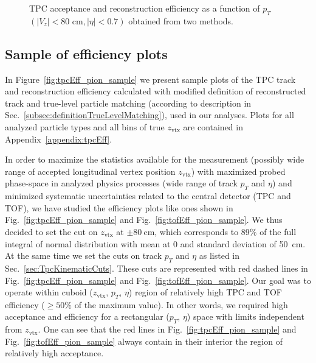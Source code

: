 \begin{figure}[ht]
{	}%
	\caption[TPC acceptance and reconstruction efficiency as a function of $p_T$ $\left(|V_z|<80\textrm{ cm}, |\eta|<0.7\right)$ obtained from two methods.]{TPC acceptance and reconstruction efficiency as a function of $p_T$ $\left(|V_z|<80\textrm{ cm}, |\eta|<0.7\right)$ obtained from two methods.}\label{fig:trackTPCefficiencyComparisonEtaPhi}
\end{figure}


\subsection{Sample of  efficiency plots}\label{subsec:sampleTpcEffPlots}

In Figure~\ref{fig:tpcEff_pion_sample} we present sample plots of the TPC track and reconstruction efficiency calculated with modified definition of reconstructed track and true-level particle matching (according to description in Sec.~\ref{subsec:definitionTrueLevelMatching}), used in our analyses. Plots for all analyzed particle types and all bins of true $z_{\text{vtx}}$ are contained in Appendix~\ref{appendix:tpcEff}.

In order to maximize the statistics available for the measurement (possibly wide range of accepted longitudinal vertex position $z_{\text{vtx}}$) with maximized probed phase-space in analyzed physics processes (wide range of track $p_{T}$ and $\eta$) and minimized systematic uncertainties related to the central detector (TPC and TOF), we have studied the efficiency plots like ones shown in Fig.~\ref{fig:tpcEff_pion_sample} and Fig.~\ref{fig:tofEff_pion_sample}. We thus decided to set the cut on $z_{\text{vtx}}$ at $\pm80~\text{cm}$, which corresponds to 89\% of the full integral of normal distribution with mean at 0 and standard deviation of 50~cm. At the same time we set the cuts on track $p_{T}$ and $\eta$ as listed in Sec.~\ref{sec:TpcKinematicCuts}. These cuts are represented with red dashed lines in Fig.~\ref{fig:tpcEff_pion_sample} and Fig.~\ref{fig:tofEff_pion_sample}. Our goal was to operate within cuboid ($z_{\text{vtx}}$, $p_{T}$, $\eta$) region of relatively high TPC and TOF efficiency ($\geq50\%$ of the maximum value). In other words, we required high acceptance and efficiency for a rectangular ($p_{T}$, $\eta$) space with limits independent from $z_{\text{vtx}}$. One can see that the red lines in Fig.~\ref{fig:tpcEff_pion_sample} and Fig.~\ref{fig:tofEff_pion_sample} always contain in their interior the region of relatively high acceptance.


